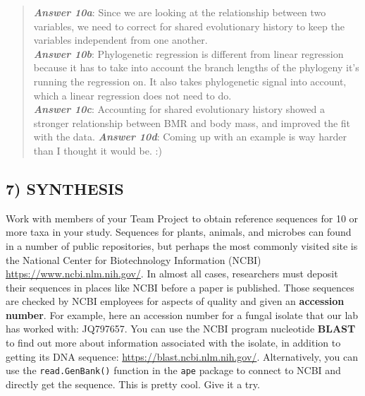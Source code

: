 \documentclass[]{article}
\begin{document}
\begin{quote}
\textbf{\emph{Answer 10a}}: Since we are looking at the relationship
between two variables, we need to correct for shared evolutionary
history to keep the variables independent from one another.\\
\textbf{\emph{Answer 10b}}: Phylogenetic regression is different from
linear regression because it has to take into account the branch lengths
of the phylogeny it's running the regression on. It also takes
phylogenetic signal into account, which a linear regression does not
need to do.\\
\textbf{\emph{Answer 10c}}: Accounting for shared evolutionary history
showed a stronger relationship between BMR and body mass, and improved
the fit with the data. \textbf{\emph{Answer 10d}}: Coming up with an
example is way harder than I thought it would be. :)
\end{quote}

\subsection{7) SYNTHESIS}\label{synthesis}

Work with members of your Team Project to obtain reference sequences for
10 or more taxa in your study. Sequences for plants, animals, and
microbes can found in a number of public repositories, but perhaps the
most commonly visited site is the National Center for Biotechnology
Information (NCBI) \url{https://www.ncbi.nlm.nih.gov/}. In almost all
cases, researchers must deposit their sequences in places like NCBI
before a paper is published. Those sequences are checked by NCBI
employees for aspects of quality and given an \textbf{accession number}.
For example, here an accession number for a fungal isolate that our lab
has worked with: JQ797657. You can use the NCBI program nucleotide
\textbf{BLAST} to find out more about information associated with the
isolate, in addition to getting its DNA sequence:
\url{https://blast.ncbi.nlm.nih.gov/}. Alternatively, you can use the
\texttt{read.GenBank()} function in the \texttt{ape} package to connect
to NCBI and directly get the sequence. This is pretty cool. Give it a
try.
\end{document}
